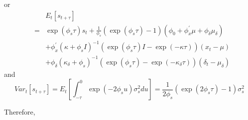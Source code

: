 \documentclass{article}
\begin{document}
or%
\begin{eqnarray*}
&&E_{t}\left[ s_{t+\tau }\right]  \\
&=&\exp \left( \phi _{s}\tau \right) s_{t}+\frac{1}{\phi _{s}}\left( \exp
\left( \phi _{s}\tau \right) -1\right) \left( \phi _{0}+\phi _{x}^{\prime
}\mu +\phi _{\delta }\mu _{\delta }\right)  \\
&&+\phi _{x}^{\prime }\left( \kappa +\phi _{s}I\right) ^{-1}\left( \exp
\left( \phi _{s}\tau \right) I-\exp \left( -\kappa \tau \right) \right)
\left( x_{t}-\mu \right)  \\
&&+\phi _{\delta }\left( \kappa _{\delta }+\phi _{s}\right) ^{-1}\left( \exp
\left( \phi _{s}\tau \right) -\exp \left( -\kappa _{\delta }\tau \right)
\right) \left( \delta _{t}-\mu _{\delta }\right) 
\end{eqnarray*}%
and%
\begin{equation*}
Var_{t}\left[ s_{t+\tau }\right] =E_{t}\left[ \int_{-\tau }^{0}\exp \left(
-2\phi _{s}u\right) \sigma _{s}^{2}du\right] =\frac{1}{2\phi _{s}}\left(
\exp \left( 2\phi _{s}\tau \right) -1\right) \sigma _{s}^{2}
\end{equation*}

Therefore,
\end{document}
